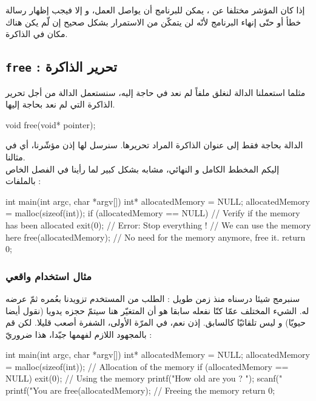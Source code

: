 إذا كان المؤشر مختلفا عن
،
يمكن للبرنامج أن يواصل العمل، و إلا فيجب إظهار رسالة خطأ أو حتّى إنهاء البرنامج لأنّه لن يتمكّن من الاستمرار بشكل صحيح إن لّم يكن هناك مكان في الذاكرة.

\subsection{\texttt{free} :
تحرير الذاكرة}
مثلما استعملنا الدالة
لنغلق ملفاً لم نعد في حاجة إليه، سنستعمل الدالة
من أجل تحرير الذاكرة التي لم نعد بحاجة إليها.

\begin{Csource}
void free(void* pointer);
\end{Csource}

الدالة
بحاجة فقط إلى عنوان الذاكرة المراد تحريرها. سنرسل لها إذن مؤشّرنا، أي
في مثالنا.\\
إليكم المخطط الكامل و النهائي، مشابه بشكل كبير لما رأينا في الفصل الخاص بالملفات :

\begin{Csource}
int main(int argc, char *argv[])
{
	int* allocatedMemory = NULL;
	allocatedMemory = malloc(sizeof(int));
	if (allocatedMemory == NULL) // Verify if the memory has been allocated
	{
		exit(0); // Error: Stop everything !
	}
	// We can use the memory here
	free(allocatedMemory); // No need for the memory anymore, free it.
	return 0;
}
\end{Csource}

\subsubsection{مثال استخدام واقعي}
سنبرمج شيئا درسناه منذ زمن طويل : الطلب من المستخدم تزويدنا بعُمره ثمّ عرضه له. الشيء المختلف عمّا كنّا نفعله سابقا هو أن المتغيّر هنا سيتمّ حجزه يدويا (نقول أيضا حيويّا) و ليس تلقائيّا كالسابق. إذن نعم، في المرّة الأولى، الشفرة أصعب قليلا. لكن قم بالمجهود اللازم لفهمها جيّدا، هذا ضروريّ :

\begin{Csource}
int main(int argc, char *argv[])
{
	int* allocatedMemory = NULL;
	allocatedMemory = malloc(sizeof(int)); // Allocation of the memory
	if (allocatedMemory == NULL)
	{
		exit(0);
	}
	// Using the memory
	printf("How old are you ? ");
	scanf("%
	printf("You are %
	free(allocatedMemory); // Freeing the memory
	 return 0;
}
\end{Csource}


